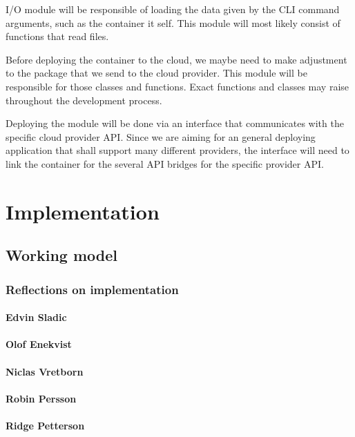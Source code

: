\documentclass[a4paper,15pt,twoside]{article}
\begin{document}
I/O module will be responsible of loading the data given by the CLI command arguments, such as the container it self. This module will most likely consist of functions that read files. 

Before deploying the container to the cloud, we maybe need to make adjustment to the package that we send to the cloud provider. This module will be responsible for those classes and functions. Exact functions and classes may raise throughout the development process.

Deploying the module will be done via an interface that communicates with the specific cloud provider API. Since we are aiming for an general deploying application that shall support many different providers, the interface will need to link the container for the several API bridges for the specific provider API.
\newpage
\section{Implementation}

\subsection{Working model}

\subsubsection{Reflections on implementation}

\paragraph*{Edvin Sladic}
\paragraph*{Olof Enekvist}
\paragraph*{Niclas Vretborn}
\paragraph*{Robin Persson}
\paragraph*{Ridge Petterson}
\end{document}
